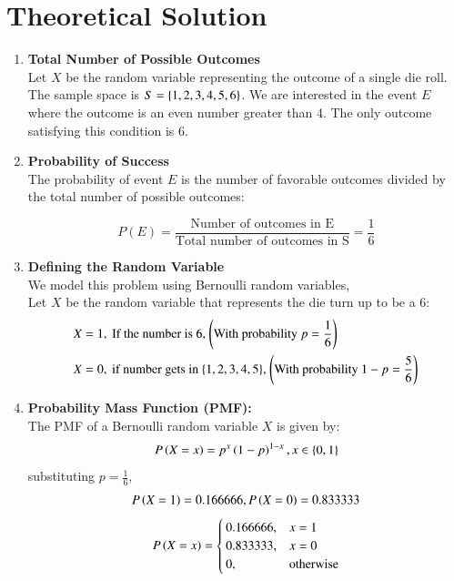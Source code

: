\documentclass[journal]{IEEEtran}
\numberwithin{equation}{enumi}
\numberwithin{figure}{enumi}
\begin{document}
\section{Theoretical Solution}
\begin{enumerate}
    \item \textbf{Total Number of Possible Outcomes}\\
    Let $X$ be the random variable representing the outcome of a single die roll. The sample space is $ S = \left\{1, 2, 3, 4, 5, 6\right\}$.  We are interested in the event $E$ where the outcome is an even number greater than 4.  The only outcome satisfying this condition is 6.

    \item \textbf{Probability of Success}\\
    The probability of event $E$ is the number of favorable outcomes divided by the total number of possible outcomes:

$$P(E) = \frac{\text{Number of outcomes in E}}{\text{Total number of outcomes in S}} = \frac{1}{6}$$
    \item \textbf{Defining the Random Variable}\\
    We model this problem using Bernoulli random variables,\\
    Let $X$ be the random variable that represents the die turn up to be a 6:
    \begin{align}
        X &= 1, \text{ If the number is 6, \ensuremath{\left(\text{With probability }p = \frac{1}{6}\right)}}\\
        X &= 0, \text{ if number gets in \ensuremath{\left\{1,2,3,4,5\right\}}, \ensuremath{\left(\text{With probability } 1 -p = \frac{5}{6}\right)}}
    \end{align}
    \item \textbf{Probability Mass Function (PMF):}\\
    The PMF  of a Bernoulli random variable $X$ is given by:
    \begin{align}
	P\left(X = x\right) = p^x\left(1 - p\right)^{1 - x}, x \in \left\{0,1\right\}
    \end{align}
    substituting $p = \frac{1}{6}$,\\
    \begin{align}
     P\left(X = 1\right) = 0.166666, P\left(X = 0\right) = 0.833333
    \end{align}
    \begin{align}
    	P\left(X = x\right) = \begin{cases}
    		0.166666, & x = 1 \\
    		0.833333, & x = 0 \\
    		0, & \text{otherwise}
    	\end{cases}
    \end{align}


\end{enumerate}
\end{document}

